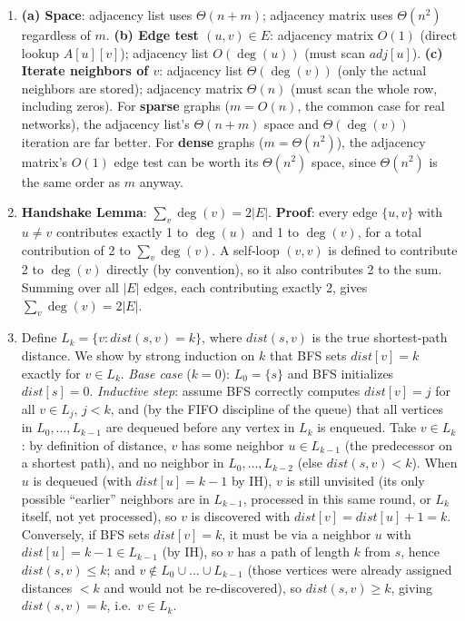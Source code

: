 \documentclass[11pt]{article}
\begin{document}
\begin{enumerate}[label=\textbf{A\arabic*.}, leftmargin=2.2em]

\item \textbf{(a) Space}: adjacency list uses $\Theta(n+m)$; adjacency matrix uses
$\Theta(n^2)$ regardless of $m$. \textbf{(b) Edge test $(u,v) \in E$}: adjacency matrix
$O(1)$ (direct lookup $A[u][v]$); adjacency list $O(\deg(u))$ (must scan $adj[u]$).
\textbf{(c) Iterate neighbors of $v$}: adjacency list $\Theta(\deg(v))$ (only the actual
neighbors are stored); adjacency matrix $\Theta(n)$ (must scan the whole row, including
zeros). For \textbf{sparse} graphs ($m = O(n)$, the common case for real networks), the
adjacency list's $\Theta(n+m)$ space and $\Theta(\deg(v))$ iteration are far better. For
\textbf{dense} graphs ($m = \Theta(n^2)$), the adjacency matrix's $O(1)$ edge test can be
worth its $\Theta(n^2)$ space, since $\Theta(n^2)$ is the same order as $m$ anyway.

\item \textbf{Handshake Lemma}: $\sum_v \deg(v) = 2|E|$. \textbf{Proof}: every edge
$\{u,v\}$ with $u \ne v$ contributes exactly 1 to $\deg(u)$ and 1 to $\deg(v)$, for a total
contribution of 2 to $\sum_v \deg(v)$. A self-loop $(v,v)$ is defined to contribute 2 to
$\deg(v)$ directly (by convention), so it also contributes 2 to the sum. Summing over all
$|E|$ edges, each contributing exactly 2, gives $\sum_v \deg(v) = 2|E|$.

\item Define $L_k = \{v : dist(s,v) = k\}$, where $dist(s,v)$ is the true shortest-path
distance. We show by strong induction on $k$ that BFS sets $dist[v] = k$ exactly for $v
\in L_k$. \emph{Base case} ($k=0$): $L_0 = \{s\}$ and BFS initializes $dist[s] = 0$.
\emph{Inductive step}: assume BFS correctly computes $dist[v] = j$ for all $v \in L_j$,
$j < k$, and (by the FIFO discipline of the queue) that all vertices in $L_0, \dots,
L_{k-1}$ are dequeued before any vertex in $L_k$ is enqueued. Take $v \in L_k$: by
definition of distance, $v$ has some neighbor $u \in L_{k-1}$ (the predecessor on a
shortest path), and no neighbor in $L_0, \dots, L_{k-2}$ (else $dist(s,v) < k$). When $u$
is dequeued (with $dist[u]=k-1$ by IH), $v$ is still unvisited (its only possible
``earlier'' neighbors are in $L_{k-1}$, processed in this same round, or $L_k$ itself, not
yet processed), so $v$ is discovered with $dist[v] = dist[u]+1 = k$. Conversely, if BFS
sets $dist[v]=k$, it must be via a neighbor $u$ with $dist[u]=k-1 \in L_{k-1}$ (by IH),
so $v$ has a path of length $k$ from $s$, hence $dist(s,v) \le k$; and $v \notin L_0 \cup
\dots \cup L_{k-1}$ (those vertices were already assigned distances $<k$ and would not be
re-discovered), so $dist(s,v) \ge k$, giving $dist(s,v)=k$, i.e.\ $v \in L_k$.


\end{enumerate}
\end{document}
